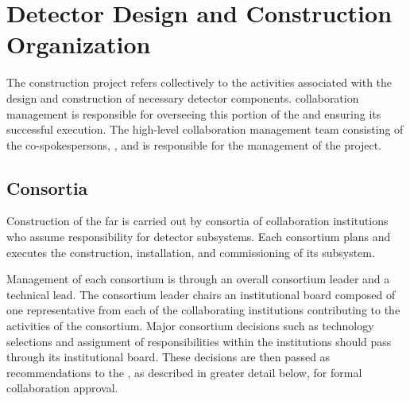 \chapter{Detector Design and Construction Organization}
\label{vl:tc-overview}

The   construction project refers collectively 
to the activities associated with the design and construction of 
necessary detector components.   collaboration management 
is responsible for overseeing this portion of the  and 
ensuring its successful execution.  The high-level  
collaboration management team consisting of the co-spokespersons, 
, and  is responsible for the
management of the project.  

\section{ Consortia}
\label{sec:consortia}

Construction of the  far  is carried out by 
consortia of collaboration institutions who assume responsibility 
for detector subsystems.  Each consortium plans and executes the 
construction, installation, and commissioning of its subsystem.

Management of each consortium is through an overall consortium leader 
and a technical lead.  The consortium leader chairs an institutional 
board composed of one representative from each of the collaborating 
institutions contributing to the activities of the consortium.  Major 
consortium decisions such as technology selections and assignment of 
responsibilities within the institutions should pass %
through its institutional board.  These decisions are then passed 
as recommendations to the  , as described in 
greater detail below, for formal collaboration approval.

